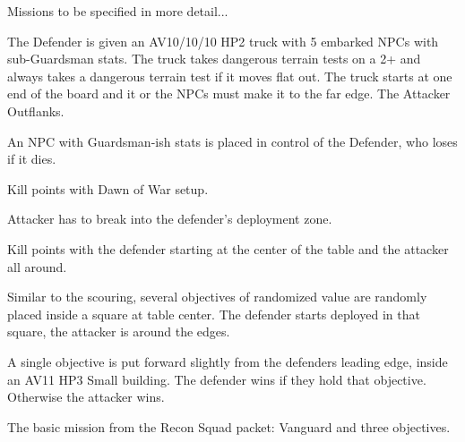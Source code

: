 \clearpage
{}

Missions to be specified in more detail...


The Defender is given an AV10/10/10 HP2 truck with 5 embarked NPCs
with sub-Guardsman stats.  The truck takes dangerous terrain tests on
a 2+ and always takes a dangerous terrain test if it moves flat out.
The truck starts at one end of the board and it or the NPCs must make
it to the far edge.  The Attacker Outflanks.



An NPC with Guardsman-ish stats is placed in control of the Defender,
who loses if it dies.



Kill points with Dawn of War setup.



Attacker has to break into the defender's deployment zone.



Kill points with the defender starting at the center of the table and
the attacker all around.



Similar to the scouring, several objectives of randomized value are
randomly placed inside a square at table center.  The defender starts
deployed in that square, the attacker is around the edges.



A single objective is put forward slightly from the defenders leading
edge, inside an AV11 HP3 Small building.  The defender wins if they
hold that objective.  Otherwise the attacker wins.



The basic mission from the Recon Squad packet: Vanguard and three objectives.










